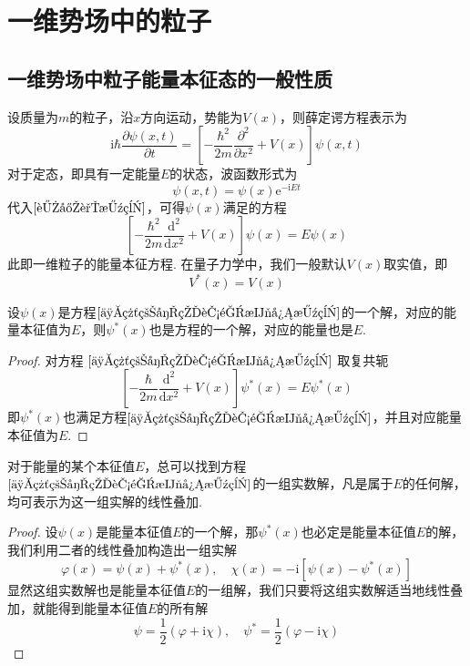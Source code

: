 \section{一维势场中的粒子}

\subsection{一维势场中粒子能量本征态的一般性质}

设质量为$m$的粒子，沿$x$方向运动，势能为$V(x)$，则薛定谔方程表示为
\begin{equation}\label{薛定谔方程}
    \mathrm{i}\hbar\frac{\partial \psi(x,t)}{\partial t} = \left[-\frac{\hbar^2}{2m}\frac{\partial^2 }{\partial x^2}+V(x)\right]\psi(x,t)
\end{equation}
对于定态，即具有一定能量$E$的状态，波函数形式为
\begin{equation}
    \psi(x,t)=\psi(x)\mathrm{e}^{-\mathrm{i}Et}
\end{equation}
代入$\eqref{薛定谔方程}$，可得$\psi(x)$满足的方程
\begin{equation}\label{一维粒子的能量本征方程}
    \left[-\frac{\hbar^2}{2m}\frac{\mathrm{d}^2}{\mathrm{d}x^2}+V(x)\right]\psi(x)=E\psi(x)
\end{equation}
此即一维粒子的能量本征方程. 在量子力学中，我们一般默认$V(x)$取实值，即
\begin{equation}\label{量子力学中的势能是实数}
    V^*(x) = V(x)
\end{equation}



\begin{theorem}\label{定理1}
    设$\psi(x)$是方程$\eqref{一维粒子的能量本征方程}$的一个解，对应的能量本征值为$E$，则$\psi^*(x)$也是方程的一个解，对应的能量也是$E$.
\end{theorem}
\begin{proof}
    对方程 $\eqref{一维粒子的能量本征方程}$ 取复共轭
    $$
        \left[-\frac{\hbar}{2m}\frac{\mathrm{d}^2}{\mathrm{d}x^2}+V(x)\right]\psi^*(x)=E\psi^*(x)
    $$
    即$\psi^*(x)$也满足方程$\eqref{一维粒子的能量本征方程}$，并且对应能量本征值为$E$.
\end{proof}





\begin{theorem}\label{定理2}
    对于能量的某个本征值$E$，总可以找到方程$\eqref{一维粒子的能量本征方程}$的一组实数解，凡是属于$E$的任何解，均可表示为这一组实解的线性叠加.
\end{theorem}
\begin{proof}
    设$\psi(x)$是能量本征值$E$的一个解，那$\psi^*(x)$也必定是能量本征值$E$的解，我们利用二者的线性叠加构造出一组实解
    $$
        \varphi(x)=\psi(x)+\psi^*(x), \quad
        \chi(x) = -\mathrm{i}[\psi(x)-\psi^*(x)]
    $$
    显然这组实数解也是能量本征值$E$的一组解，我们只要将这组实数解适当地线性叠加，就能得到能量本征值$E$的所有解
    $$
        \psi=\frac{1}{2}(\varphi+\mathrm{i}\chi), \quad
        \psi^*=\frac{1}{2}(\varphi-\mathrm{i}\chi)
    $$
\end{proof}



